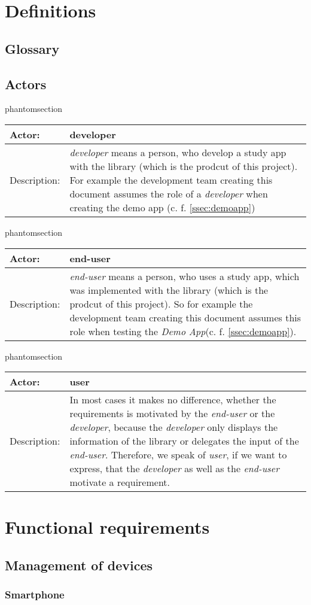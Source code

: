 \documentclass[12pt]{article}
\makeatletter
\newcommand{\labeltext}[2]{%
  \@bsphack
  \csname phantomsection\endcsname %
  \def\@currentlabel{#1}{\label{#2}}%
  \@esphack
}
\newcommand{\actor}[3]{
\labeltext{#2}{#1}
\begin{tabularx}{16cm}{|l|X|}
\hline 
Actor: & #2 \\
\hline
Description: & #3 \\
\hline
\end{tabularx}
}
\makeatother
\begin{document}
\section{Definitions}
\subsection{Glossary}

\subsection{Actors}

\actor{developer}{developer}{\textit{developer} means a person, who develop a study app with the library (which is the prodcut of this project). For example the development team creating this document assumes the role of a \textit{developer} when creating the demo app (c. f. \ref{ssec:demoapp})}

\actor{enduser}{end-user}{\textit{end-user} means a person, who uses a study app, which was implemented with the library (which is the prodcut of this project). So for example the development team creating this document assumes this role when testing the \textit{Demo App}(c. f. \ref{ssec:demoapp}).}

\actor{user}{user}{In most cases it makes no difference, whether the requirements is motivated by the \textit{end-user} or the \textit{developer}, because the \textit{developer} only displays the information of the library or delegates the input of the \textit{end-user}. Therefore, we speak of \textit{user}, if we want to express, that the \textit{developer} as well as the \textit{end-user} motivate a requirement.}

\section{Functional requirements}
\subsection{Management of devices}
\label{ssec:Management of devices}
\subsubsection{Smartphone}
\end{document}

